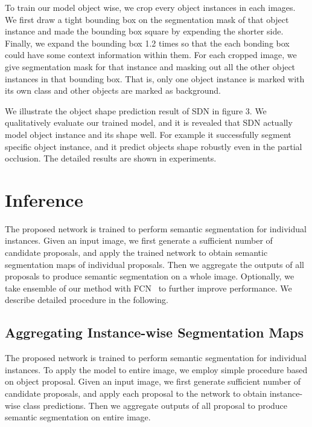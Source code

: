 \documentclass[10pt,twocolumn,letterpaper]{article}
\begin{document}
To train our model object wise, we crop every object instances in each images. 
We first draw a tight bounding box on the segmentation mask of that object instance and made the bounding box square by expending the shorter side. 
Finally, we expand the bounding box 1.2 times so that the each bonding box could have some context information within them. 
For each cropped image, we give segmentation mask for that instance and masking out all the other object instances in that bounding box. 
That is, only one object instance is marked with its own class and other objects are marked as background.
\fi

We illustrate the object shape prediction result of SDN in figure 3. 
We qualitatively evaluate our trained model, and it is revealed that SDN actually model object instance and its shape well. 
For example it successfully segment specific object instance, and it predict objects shape robustly even in the partial occlusion. 
The detailed results are shown in experiments.
\fi

 


\section{Inference}
\label{sec:image}

The proposed network is trained to perform semantic segmentation for individual instances.
Given an input image, we first generate a sufficient number of candidate proposals, and apply the trained network to obtain semantic segmentation maps of individual proposals. 
Then we aggregate the outputs of all proposals to produce semantic segmentation on a whole image.
Optionally, we take ensemble of our method with FCN~\cite{Fcn} to further improve performance. 
We describe detailed procedure in the following.

 
\subsection{Aggregating Instance-wise Segmentation Maps}
\iffalse
\ifdefined\paratitle {\color{blue}  [As our network is designed for instance-wise semantic segmentation, we obtain output maps of individual proposal given an test image]} \\ \fi
The proposed network is trained to perform semantic segmentation for individual instances.
To apply the model to entire image, we employ simple procedure based on object proposal.
Given an input image, we first generate sufficient number of candidate proposals, and apply each proposal to the network to obtain instance-wise class predictions. 
Then we aggregate outputs of all proposal to produce semantic segmentation on entire image.
\fi
\end{document}
